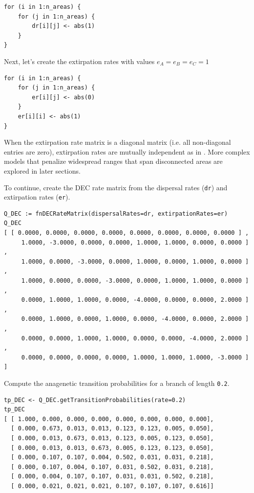 \begin{snugshade}
\begin{lstlisting}
for (i in 1:n_areas) {
    for (j in 1:n_areas) {
        dr[i][j] <- abs(1)
    }
}
\end{lstlisting}
\end{snugshade}

Next, let's create the extirpation rates with values $e_A=e_B=e_C=1$

\begin{snugshade}
\begin{lstlisting}
for (i in 1:n_areas) {
    for (j in 1:n_areas) {
        er[i][j] <- abs(0)
    }
    er[i][i] <- abs(1) 
}
\end{lstlisting}
\end{snugshade}

When the extirpation rate matrix is a diagonal matrix (i.e. all non-diagonal entries are zero), extirpation rates are mutually independent as in \citep{Ree2005}.
More complex models that penalize widespread ranges that span disconnected areas are explored in later sections.

To continue, create the DEC rate matrix from the dispersal rates ({\tt dr}) and extirpation rates ({\tt er}).

\begin{snugshade}
\begin{lstlisting}
Q_DEC := fnDECRateMatrix(dispersalRates=dr, extirpationRates=er)
Q_DEC
[ [ 0.0000, 0.0000, 0.0000, 0.0000, 0.0000, 0.0000, 0.0000, 0.0000 ] ,
     1.0000, -3.0000, 0.0000, 0.0000, 1.0000, 1.0000, 0.0000, 0.0000 ] ,
     1.0000, 0.0000, -3.0000, 0.0000, 1.0000, 0.0000, 1.0000, 0.0000 ] ,
     1.0000, 0.0000, 0.0000, -3.0000, 0.0000, 1.0000, 1.0000, 0.0000 ] ,
     0.0000, 1.0000, 1.0000, 0.0000, -4.0000, 0.0000, 0.0000, 2.0000 ] ,
     0.0000, 1.0000, 0.0000, 1.0000, 0.0000, -4.0000, 0.0000, 2.0000 ] ,
     0.0000, 0.0000, 1.0000, 1.0000, 0.0000, 0.0000, -4.0000, 2.0000 ] ,
     0.0000, 0.0000, 0.0000, 0.0000, 1.0000, 1.0000, 1.0000, -3.0000 ] ]
\end{lstlisting}
\end{snugshade}

Compute the anagenetic transition probabilities for a branch of length {\tt 0.2}.

\begin{snugshade}
\begin{lstlisting}
tp_DEC <- Q_DEC.getTransitionProbabilities(rate=0.2)
tp_DEC
[ [ 1.000, 0.000, 0.000, 0.000, 0.000, 0.000, 0.000, 0.000],
  [ 0.000, 0.673, 0.013, 0.013, 0.123, 0.123, 0.005, 0.050],
  [ 0.000, 0.013, 0.673, 0.013, 0.123, 0.005, 0.123, 0.050],
  [ 0.000, 0.013, 0.013, 0.673, 0.005, 0.123, 0.123, 0.050],
  [ 0.000, 0.107, 0.107, 0.004, 0.502, 0.031, 0.031, 0.218],
  [ 0.000, 0.107, 0.004, 0.107, 0.031, 0.502, 0.031, 0.218],
  [ 0.000, 0.004, 0.107, 0.107, 0.031, 0.031, 0.502, 0.218],
  [ 0.000, 0.021, 0.021, 0.021, 0.107, 0.107, 0.107, 0.616]]
\end{lstlisting}
\end{snugshade}

